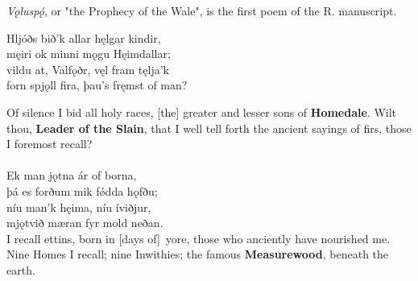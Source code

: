 \bookStart


\small{\emph{Vǫluspǫ́}, or "the Prophecy of the Wale\footnotemark[1]", is the first poem of the R. manuscript.}


\bva Hljóðs bið'k allar \hld hęlgar kindir, \\%
męiri ok minni \hld mǫgu Hęimdallar; \\%
vildu at, Valfǫðr, \hld vęl fram tęlja'k \\%
forn spjǫll fira, \hld þau's fręmst of man?

\bvb Of silence I bid all holy races\footnotemark[1], [the] greater and lesser sons of \textbf{Homedale}\footnotemark[2]. Wilt thou, \textbf{Leader of the Slain}\footnotemark[3], that I well tell forth the ancient sayings of firs\footnotemark[4], those I foremost recall?\footnotemark[5] \\
\\%

\bva Ek man jǫtna \hld ár of borna, \\%
þá es forðum \hld mik fǿdda hǫfðu; \\%
níu man'k hęima, \hld níu íviðjur\footnotemark[4], \\%
mjǫtvið mæran \hld fyr mold neðan.
\\%

\bvb I recall ettins, born in [days of] yore, those who anciently have nourished me. Nine Homes I recall; nine Inwithies; the famous \textbf{Measurewood}, beneath the earth.

